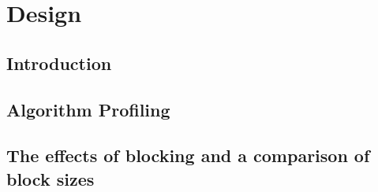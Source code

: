 \chapter{Design}
\label{ch:design}

\section{Introduction}
\label{sec:design:Introduction}


\section{Algorithm Profiling}
\label{sec:design:algorithmProfiling}


\section{The effects of blocking and a comparison of block sizes}
\label{sec:design:blockSize}

